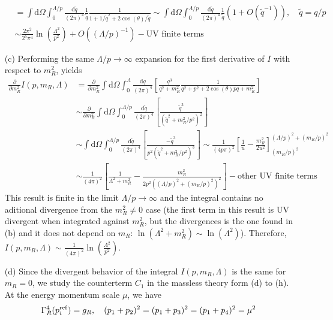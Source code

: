 \documentclass[10pt, a4paper]{article}
\begin{document}
\begin{enumerate}
\begin{align*}
    &= \int \text{d} \Omega \int_0^{\Lambda/p} \frac{\text{d} \tilde{q}}{(2\pi)^4} \frac{1}{\tilde{q}} \frac{1}{1 + 1/\tilde{q}^2 + 2 \cos(\theta)/\tilde{q}} \sim \int \text{d} \Omega \int_0^{\Lambda/p} \frac{\text{d} \tilde{q}}{(2\pi)^4} \frac{1}{\tilde{q}} (1+O(\tilde{q}^{-1})) , \quad \tilde{q} = q/p\\
    &\sim \frac{2\pi^2}{2^5\pi^4}\ln\left(\frac{\Lambda^2}{p^2}\right)  + O((\Lambda/p)^{-1})- \text{UV finite terms}
  \end{align*}
  \item[(c)] Performing the same $\Lambda/p \to \infty$ expansion for the first derivative of $I$ with respect to $m_R^2$, yields 
  \begin{align*}
   \frac{\partial}{\partial m^2_R} I(p, m_R, \Lambda)&= \frac{\partial}{\partial m^2_R}\int \text{d} \Omega \int_0^{\Lambda} \frac{\text{d} q}{(2\pi)^4} \left[\frac{q^3}{q^2 + m_R^2} \frac{1}{q^2 + p^2 + 2 \cos(\theta) pq  + m_R^2} \right]\\
  &\sim \frac{\partial}{\partial m^2_R}\int \text{d} \Omega \int_0^{\Lambda/p} \frac{\text{d} \tilde{q}}{(2\pi)^4} \left[\frac{\tilde{q}^3}{(\tilde{q}^2 + m_R^2/p^2)^2}\right]\\
   &\sim \int \text{d} \Omega \int_0^{\Lambda/p} \frac{\text{d} \tilde{q}}{(2\pi)^4} \left[\frac{-\tilde{q}^3}{p^2 (\tilde{q}^2 + m_R^2/p^2)^3}\right] \sim \frac{1}{(4p\pi)^2}\left[\frac{1}{u}-\frac{m_R^2}{2u^2}\right]_{(m_R/p)^2}^{(\Lambda/p)^2 + (m_R/p)^2}\\
   &\sim \frac{1}{(4\pi)^2}\left[\frac{1}{\Lambda^2 + m_R^2} -\frac{m_R^2}{2p^2((\Lambda/p)^2 + (m_R/p)^2)^2}\right] - \text{other UV finite terms}
  \end{align*}
  This result is finite in the limit $\Lambda/p \to \infty$ and the integral contains no  aditional divergence from the $m_R^2 \neq 0$ case (the first term in this result is UV divergent when integrated against $m_R^2$, but the divergences is the one found in (b) and it does not depend on $m_R$: $\ln(\Lambda^2 + m_R^2) \sim \ln(\Lambda^2)$). Therefore, $I(p, m_R, \Lambda) \sim \frac{1}{(4\pi)^2}\ln\left(\frac{\Lambda^2}{p^2}\right)$.
  \item[(d)] Since the divergent behavior of the integral $I(p, m_R, \Lambda)$ is the same for $m_R = 0$, we study the counterterm $C_1$  in the massless theory form (d) to (h). At the energy momentum scale $\mu$, we have 
  \begin{align*}
    \Gamma^{4}_R(p_i^{\rm ref}) = g_R, \quad (p_1 + p_2)^2 = (p_1 + p_3)^2 = (p_1 + p_4)^2 = \mu^2

\end{align*}
\end{enumerate}
\end{document}
